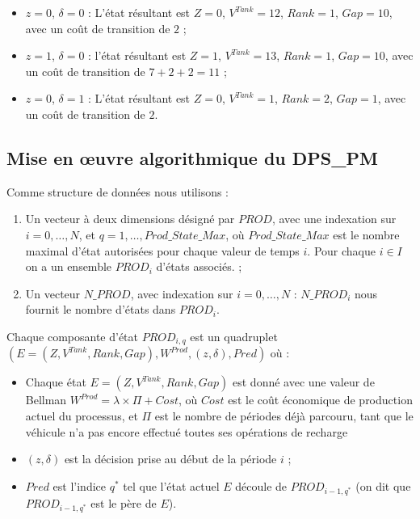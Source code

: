 \begin{enumerate}
\begin{Example}
\begin{itemize}[label=$\square$]
			\item $z = 0$, $\delta = 0$ : L'état résultant est $Z = 0$, $V^{Tank} = 12$, $Rank = 1$, $Gap = 10$, avec un coût de transition de $ 2$ ; 
			\item $z = 1$, $\delta = 0$ : l'état résultant est $Z = 1$, $V^{Tank} = 13$, $Rank = 1$, $Gap = 10$, avec un coût de transition de $7 + 2 + 2 = 11$ ; 
			
			\item $z = 0$, $\delta = 1$ : L'état résultant est $Z = 0$, $V^{Tank} = 1$, $Rank = 2$,  $Gap = 1$, avec un coût de transition de $ 2$.
		\end{itemize}
		
		
	\end{Example}
	
\end{enumerate}
\subsection{Mise en œuvre algorithmique du DPS\_PM}



Comme structure de données nous utilisons :
\begin{enumerate}
	
	
	\item Un vecteur à deux dimensions désigné par $PROD$, avec une indexation sur $i = 0, \dots, N$, et $q = 1, \dots, Prod\_State\_Max$, où $Prod\_State\_Max$ est le nombre maximal d'état autorisées pour chaque valeur de temps $i$. Pour chaque $i \in I$ on a un ensemble $PROD_i$ d'états associés. ; 
	\item Un vecteur $N\_PROD$, avec indexation sur $i = 0, \dots, N$ : $N\_PROD_i$ nous fournit le nombre d'états dans $PROD_i$.
	
\end{enumerate}
 
 Chaque composante d'état $PROD_{i, q}$ est un quadruplet $(E = (Z, V^{Tank}, Rank, Gap), W^{Prod}, (z, \delta), Pred)$ où :
\begin{itemize}[label=$\square$]
	\item Chaque état $E = (Z, V^{Tank}, Rank, Gap)$ est donné avec une valeur de Bellman $W^{Prod} =\lambda \times \Pi  + Cost$, où $Cost$ est le coût économique de production actuel du processus, et $\Pi$ est le nombre de périodes déjà parcouru, tant que le véhicule n'a pas encore effectué toutes ses opérations de recharge
	\item $(z,\delta )$ est la décision prise au début de la période $i$ ;
	\item $Pred$ est l'indice $q^*$ tel que l'état actuel $E$ découle de $PROD_{i-1, q^* }$ (on dit que $PROD_{i-1, q^* }$ est le père de $E$).
\end{itemize}

